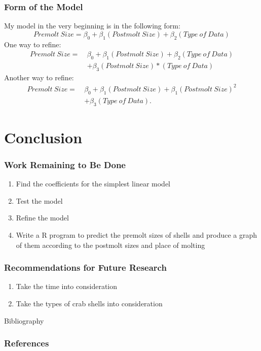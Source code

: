 \documentclass[compress,handout,10pt]{beamer}
\let\olditem\item
\renewcommand{\item}{\setlength{\itemsep}{0.5\baselineskip}\olditem}
\begin{document}
\begin{frame}
    \frametitle{Form of the Model}
     My model in the very beginning is in the following form:
     $$Premolt~Size=\beta_0 + \beta_1 (Postmolt~Size) + \beta_2 (Type~of~Data)$$
     One way to refine:
     \begin{align*}
      Premolt~Size = ~&\beta_0 + \beta_1 (Postmolt~Size) + \beta_2 (Type~of~Data)\\
               & + \beta_3 (Postmolt~Size)*(Type~of~Data)
     \end{align*}
     Another way to refine:
     \begin{align*}
      Premolt~Size = ~&\beta_0 + \beta_1 (Postmolt~Size) + \beta_1 (Postmolt~Size)^2\\
               & + \beta_3 (Type~of~Data).
     \end{align*}
\end{frame}

\section{Conclusion}
\begin{frame}
    \frametitle{Work Remaining to Be Done}
     \begin{enumerate}
         \item Find the coefficients for the simplest linear model
         \item Test the model
         \item Refine the model
	 \item Write a R program to predict the premolt sizes of shells and produce a graph of them according to the postmolt sizes and place of molting 
     \end{enumerate}
\end{frame}

\begin{frame}
    \frametitle{Recommendations for Future Research}
     \begin{enumerate}
         \item Take the time into consideration
         \item Take the types of crab shells into consideration
     \end{enumerate}
\end{frame}

\begin{frame}{Bibliography}
    \frametitle{References}
        
        \nocite{*}
        
\end{frame}
\end{document}
